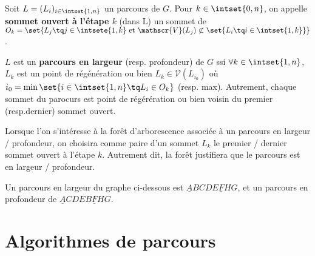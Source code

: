 \documentclass{scrartcl}
\begin{document}
			 Soit $L = (L_i)_{i \in \intset{1,n}}$ un parcours de $G$.
			Pour $k \in \intset{0,n}$, on appelle \textbf{sommet ouvert à l'étape $k$} (dans L)
			un sommet de $O_k = \set{L_j \tq j \in \intsete{1,k} \text{ et } \mathscr{V}(L_j) \not\subset \set{L_i \tq i \in \intset{1,k}}}$.

			$L$ est un \textbf{parcours en largeur} (resp. profondeur) de $G$ ssi
			$\forall k \in \intset{1,n}$, $L_k$ est un point de régénération 
			ou bien $L_k \in \mathscr{V}(L_{i_0})$ où $i_0 = \min\set{i\in\intset{1,n} \tq L_i \in O_k}$ (resp. max).	
			Autrement, chaque sommet du parocurs est point de régérération ou bien voisin du premier (resp.dernier) sommet ouvert.

			\rem Lorsque l'on s'intéresse à la forêt d'arborescence associée à un parcours en largeur / profondeur, 
			on choisira comme paire d'un sommet $L_k$ le premier / dernier sommet ouvert à l'étape $k$.
			Autrement dit, la forêt justifiera que le parcours est en largeur / profondeur.

			\exemple Un parcours en largeur du graphe ci-dessous est $\underline{A}BCDE\underline{F}HG$, 
			et un parcours en profondeur de $\underline{A}CDEB\underline{F}HG$.
			\begin{center}  \end{center}

	\section{Algorithmes de parcours}
\end{document}
